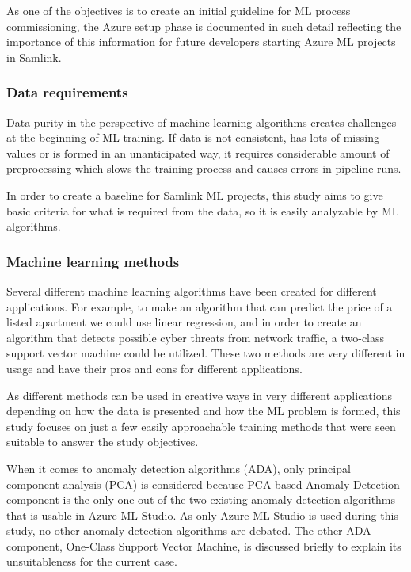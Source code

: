 As one of the objectives is to create
an initial guideline for ML process commissioning,
the Azure setup phase is documented in such detail
reflecting the importance of this information
for future developers
starting Azure ML projects in Samlink.


\subsubsection*{Data requirements}

Data purity in the perspective of machine learning algorithms
creates challenges at the beginning of ML training.
If data is not consistent,
has lots of missing values
or is formed in an unanticipated way,
it requires considerable amount of preprocessing
which slows the training process
and causes errors in pipeline runs.

In order to create a baseline for Samlink ML projects,
this study aims to give basic criteria for
what is required from the data,
so it is easily analyzable by ML algorithms.


\subsubsection*{Machine learning methods}
Several different machine learning algorithms have been created
for different applications.
For example,
to make an algorithm that can predict
the price of a listed apartment\cite{winky}
we could use linear regression,
and in order to create an algorithm that detects
possible cyber threats from network traffic\cite{ghanem},
a two-class support vector machine could be utilized.
These two methods are very different in usage
and have their pros and cons for different applications.

As different methods can be used in creative ways
in very different applications
depending on how the data is presented
and how the ML problem is formed,
this study focuses on
just a few easily approachable training methods
that were seen suitable to answer the study objectives.

When it comes to anomaly detection algorithms (ADA),
only principal component analysis (PCA) is considered
because PCA-based Anomaly Detection component is the only one
out of the two existing anomaly detection algorithms
that is usable in Azure ML Studio.
As only Azure ML Studio is used during this study,
no other anomaly detection algorithms are debated.
The other ADA-component,
One-Class Support Vector Machine,
is discussed briefly to explain its unsuitableness for the current case.


